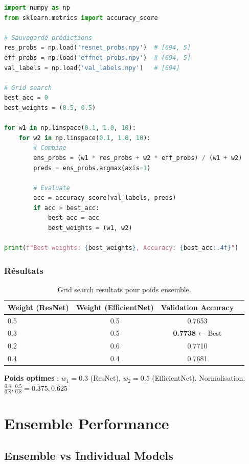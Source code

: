 \documentclass[12pt,a4paper,oneside]{report}
\begin{document}
\begin{lstlisting}[language=Python, caption=Grid search ensemble weights]
import numpy as np
from sklearn.metrics import accuracy_score

# Sauvegardé prédictions
res_probs = np.load('resnet_probs.npy')  # [694, 5]
eff_probs = np.load('effnet_probs.npy')  # [694, 5]
val_labels = np.load('val_labels.npy')   # [694]

# Grid search
best_acc = 0
best_weights = (0.5, 0.5)

for w1 in np.linspace(0.1, 1.0, 10):
    for w2 in np.linspace(0.1, 1.0, 10):
        # Combine
        ens_probs = (w1 * res_probs + w2 * eff_probs) / (w1 + w2)
        preds = ens_probs.argmax(axis=1)
        
        # Evaluate
        acc = accuracy_score(val_labels, preds)
        if acc > best_acc:
            best_acc = acc
            best_weights = (w1, w2)

print(f"Best weights: {best_weights}, Accuracy: {best_acc:.4f}")
\end{lstlisting}

\subsubsection{Résultats}

\begin{table}[H]
\centering
\begin{tabular}{|l|c|c|c|}
\hline
Weight (ResNet) & Weight (EfficientNet) & Validation Accuracy \\
\hline
0.5 & 0.5 & 0.7653 \\
0.3 & 0.5 & \textbf{0.7738} ← Best \\
0.2 & 0.6 & 0.7710 \\
0.4 & 0.4 & 0.7681 \\
\hline
\end{tabular}
\caption{Grid search résultats pour poids ensemble.}
\label{tab:ensemble_weights}
\end{table}

\textbf{Poids optimes} : $w_1 = 0.3$ (ResNet), $w_2 = 0.5$ 
(EfficientNet). Normalisation: $\frac{0.3}{0.8}, \frac{0.5}{0.8} = 0.375, 0.625$

\section{Ensemble Performance}

\subsection{Ensemble vs Individual Models}
\end{document}
